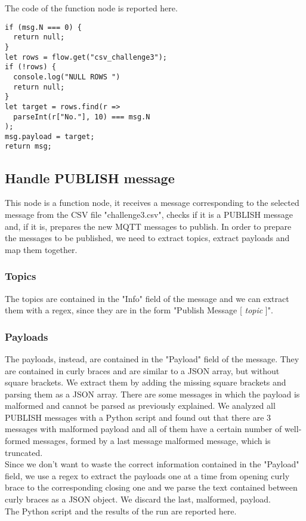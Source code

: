 The code of the function node is reported here.
\begin{verbatim}
if (msg.N === 0) {
  return null;
}
let rows = flow.get("csv_challenge3");
if (!rows) {
  console.log("NULL ROWS ")
  return null;
}
let target = rows.find(r =>
  parseInt(r["No."], 10) === msg.N
);
msg.payload = target;
return msg;
\end{verbatim}

\subsection{Handle PUBLISH message}
This node is a function node, it receives a message corresponding to the selected message from the CSV file "challenge3.csv", checks if it is a PUBLISH message and, if it is, prepares the new MQTT messages to publish. In order to prepare the messages to be published, we need to extract topics, extract payloads and map them together. 

\subsubsection{Topics}
The topics are contained in the "Info" field of the message and we can extract them with a regex, since they are in the form "Publish Message [	\textit{topic }]".

\subsubsection{Payloads}
The payloads, instead, are contained in the "Payload" field of the message. They are contained in curly braces and are similar to a JSON array, but without square brackets. 
We extract them by adding the missing square brackets and parsing them as a JSON array. There are some messages in which the payload is malformed and cannot be parsed as previously explained. We analyzed all PUBLISH messages with a Python script and found out that there are 3 messages with malformed payload and all of them have a certain number of well-formed messages, formed by a last message malformed message, which is truncated.\\
Since we don't want to waste the correct information contained in the "Payload" field, we use a regex to extract the payloads one at a time from opening curly brace to the corresponding closing one and we parse the text contained between curly braces as a JSON object. We discard the last, malformed, payload.\\
The Python script and the results of the run are reported here.

